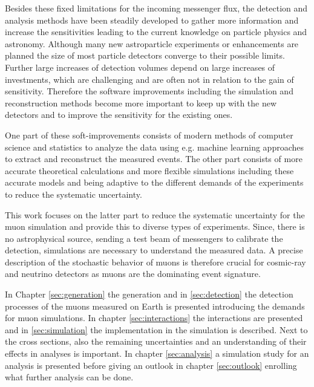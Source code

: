 Besides these fixed limitations for the incoming messenger flux, the detection and analysis methods have been steadily developed to gather more information and increase the sensitivities leading to the current knowledge on particle physics and astronomy.
Although many new astroparticle experiments or enhancements are planned the size of most particle detectors converge to their possible limits.
Further large increases of detection volumes depend on large increases of investments, which are challenging and are often not in relation to the gain of sensitivity.
Therefore the software improvements including the simulation and reconstruction methods become more important to keep up with the new detectors and to improve the sensitivity for the existing ones.

One part of these soft-improvements consists of modern methods of computer science and statistics to analyze the data using e.g. machine learning approaches to extract and reconstruct the measured events.
The other part consists of more accurate theoretical calculations and more flexible simulations including these accurate models and being adaptive to the different demands of the experiments to reduce the systematic uncertainty.

This work focuses on the latter part to reduce the systematic uncertainty for the muon simulation and provide this to diverse types of experiments.
Since, there is no astrophysical source, sending a test beam of messengers to calibrate the detection, simulations are necessary to understand the measured data.
A precise description of the stochastic behavior of muons is therefore crucial for cosmic-ray and neutrino detectors as muons are the dominating event signature.

In Chapter \ref{sec:generation} the generation and in \ref{sec:detection} the detection processes of the muons measured on Earth is presented introducing the demands for muon simulations.
In chapter \ref{sec:interactions} the interactions are presented and in \ref{sec:simulation} the implementation in the simulation is described.
Next to the cross sections, also the remaining uncertainties and an understanding of their effects in analyses is important.
In chapter \ref{sec:analysis} a simulation study for an analysis is presented before giving an outlook in chapter \ref{sec:outlook} enrolling what further analysis can be done.
